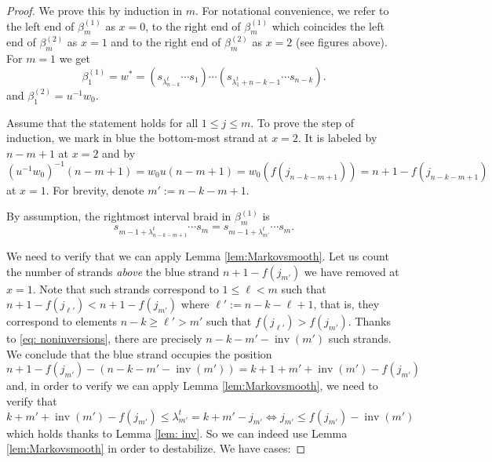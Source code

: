 \documentclass[10pt]{amsart}
\theoremstyle{plain}
\theoremstyle{definition}
\theoremstyle{remark}
\numberwithin{equation}{section}
\DeclareMathOperator{\inv}{inv}
\begin{document}
\begin{proof}
We prove this by induction in $m$. For notational convenience, we refer to the left end of $\beta^{(1)}_{m}$ as $x=0$, to the right end of $\beta^{(1)}_{m}$ which coincides the left end of $\beta^{(2)}_{m}$ as $x=1$ and to the right end of $\beta^{(2)}_{m}$ as $x=2$ (see figures above). For $m=1$ we get
\begin{equation}\label{eq: w0ww0}
\beta^{(1)}_{1}=w^*= \left(s_{\lambda^{t}_{n-k}}\cdots s_1\right)\cdots\left(s_{\lambda_{1}^{t} + n - k -1}\cdots s_{n-k}\right). 
\end{equation}
and $\beta^{(2)}_{1}=u^{-1}w_0$. 

Assume that the statement holds for all $1 \leq j \leq m$.
To prove the step of induction, we mark in blue the bottom-most strand at $x=2$. It is labeled by $n-m+1$ at $x=2$ and by $(u^{-1}w_0)^{-1}(n-m+1)  = w_0u(n-m+1) = w_0(f(j_{n-k-m+1})) = n+1-f(j_{n-k-m+1})$ at $x=1$. For brevity, denote $m' := n-k-m+1$.

By assumption, the rightmost interval braid in $\beta^{(1)}_{m}$ is
\begin{equation}\label{eq: m step}
s_{m-1+\lambda^{t}_{n-k-m+1}}\cdots s_{m}=s_{m-1+\lambda^{t}_{m'}}\cdots s_{m}.
\end{equation}

We need to verify that we can apply Lemma \ref{lem:Markovsmooth}. Let us count the number of strands \emph{above} the blue strand $n+1-f(j_{m'})$ we have removed at $x=1$. Note that such strands correspond to $1 \leq \ell < m$ such that $n+1-f(j_{\ell'}) < n+1-f(j_{m'})$ where $\ell' :=  n-k-\ell+1$, that is, they correspond to elements $n - k \geq \ell' > m'$ such that $f(j_{\ell'}) > f(j_{m'})$. Thanks to \eqref{eq: noninversions}, there are precisely $n-k-m'-\inv(m')$ such strands. We conclude that the blue strand occupies the position
\[
n + 1 - f(j_{m'}) - (n-k-m' - \inv(m')) = k+1+m'+\inv(m') - f(j_{m'})
\]
and, in order to verify we can apply Lemma \ref{lem:Markovsmooth}, we need to verify that 
\[
k+m'+\inv(m') - f(j_{m'}) \leq \lambda^{t}_{m'} = k+m'-j_{m'} \Leftrightarrow j_{m'} \leq f(j_{m'}) - \inv(m')
\]
which holds thanks to Lemma \ref{lem: inv}. So we can indeed use Lemma \ref{lem:Markovsmooth} in order to destabilize. We have cases:


\end{proof}
\end{document}
